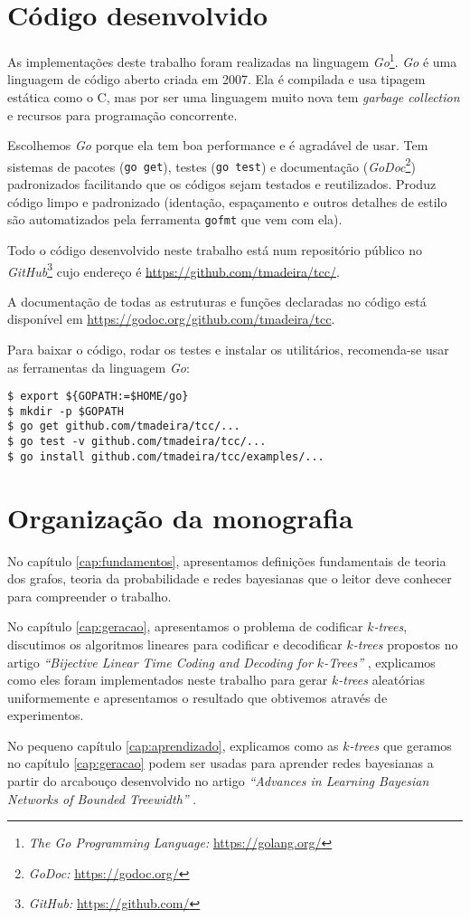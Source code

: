 \section{Código desenvolvido}

As implementações deste trabalho foram realizadas na linguagem \emph{Go}\footnote{\emph{The Go Programming Language:} \url{https://golang.org/}}. \emph{Go} é uma linguagem de código aberto criada em 2007. Ela é compilada e usa tipagem estática como o C, mas por ser uma linguagem muito nova tem \emph{garbage collection} e recursos para programação concorrente.

Escolhemos \emph{Go} porque ela tem boa performance e é agradável de usar. Tem sistemas de pacotes ({\tt go get}), testes ({\tt go test}) e documentação (\emph{GoDoc}\footnote{\emph{GoDoc:} \url{https://godoc.org/}}) padronizados facilitando que os códigos sejam testados e reutilizados. Produz código limpo e padronizado (identação, espaçamento e outros detalhes de estilo são automatizados pela ferramenta {\tt gofmt} que vem com ela).

Todo o código desenvolvido neste trabalho está num repositório público no \emph{GitHub}\footnote{\emph{GitHub:} \url{https://github.com/}} cujo endereço é \url{https://github.com/tmadeira/tcc/}.

A documentação de todas as estruturas e funções declaradas no código está disponível em \url{https://godoc.org/github.com/tmadeira/tcc}.

Para baixar o código, rodar os testes e instalar os utilitários, recomenda-se usar as ferramentas da linguagem \emph{Go}:

\begin{lstlisting}
$ export ${GOPATH:=$HOME/go}
$ mkdir -p $GOPATH
$ go get github.com/tmadeira/tcc/...
$ go test -v github.com/tmadeira/tcc/...
$ go install github.com/tmadeira/tcc/examples/...
\end{lstlisting}

\section{Organização da monografia}

No capítulo \ref{cap:fundamentos}, apresentamos definições fundamentais de teoria dos grafos, teoria da probabilidade e redes bayesianas que o leitor deve conhecer para compreender o trabalho.

No capítulo \ref{cap:geracao}, apresentamos o problema de codificar \emph{$k$-trees}, discutimos os algoritmos lineares para codificar e decodificar \emph{$k$-trees} propostos no artigo \emph{``Bijective Linear Time Coding and Decoding for $k$-Trees''} \cite{caminiti}, explicamos como eles foram implementados neste trabalho para gerar \emph{$k$-trees} aleatórias uniformemente e apresentamos o resultado que obtivemos através de experimentos.

No pequeno capítulo \ref{cap:aprendizado}, explicamos como as \emph{$k$-trees} que geramos no capítulo \ref{cap:geracao} podem ser usadas para aprender redes bayesianas a partir do arcabouço desenvolvido no artigo \emph{``Advances in Learning Bayesian Networks of Bounded Treewidth''} \cite{maua}.

